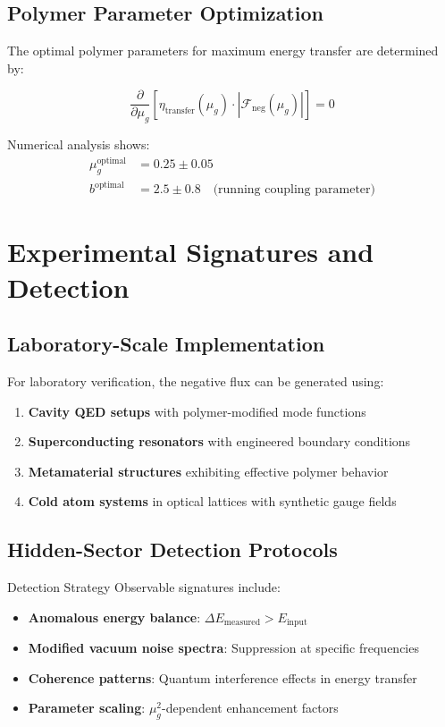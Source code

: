 \documentclass[12pt]{article}
\begin{document}
\subsection{Polymer Parameter Optimization}

The optimal polymer parameters for maximum energy transfer are determined by:

\begin{equation}
\frac{\partial}{\partial \mu_g} \left[ \eta_{\text{transfer}}(\mu_g) \cdot |\mathcal{F}_{\text{neg}}(\mu_g)| \right] = 0
\end{equation}

Numerical analysis shows:
\begin{align}
\mu_g^{\text{optimal}} &= 0.25 \pm 0.05 \\
b^{\text{optimal}} &= 2.5 \pm 0.8 \quad \text{(running coupling parameter)}
\end{align}

\section{Experimental Signatures and Detection}

\subsection{Laboratory-Scale Implementation}

For laboratory verification, the negative flux can be generated using:

\begin{enumerate}
\item \textbf{Cavity QED setups} with polymer-modified mode functions
\item \textbf{Superconducting resonators} with engineered boundary conditions
\item \textbf{Metamaterial structures} exhibiting effective polymer behavior
\item \textbf{Cold atom systems} in optical lattices with synthetic gauge fields
\end{enumerate}

\subsection{Hidden-Sector Detection Protocols}

\begin{physicsbox}{Detection Strategy}
Observable signatures include:
\begin{itemize}
\item \textbf{Anomalous energy balance}: $\Delta E_{\text{measured}} > E_{\text{input}}$
\item \textbf{Modified vacuum noise spectra}: Suppression at specific frequencies
\item \textbf{Coherence patterns}: Quantum interference effects in energy transfer
\item \textbf{Parameter scaling}: $\mu_g^2$-dependent enhancement factors
\end{itemize}
\end{physicsbox}
\end{document}
